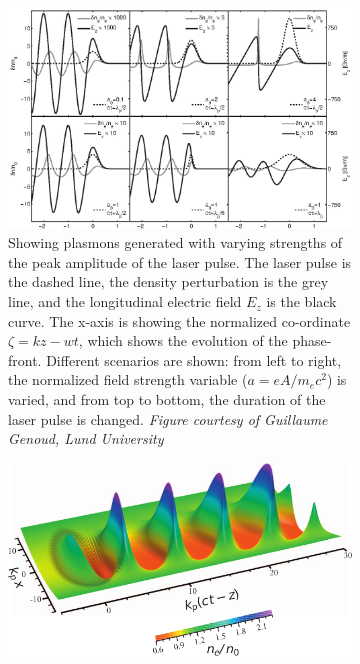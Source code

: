 \documentclass[12pt,letter]{article}
\begin{document}
\begin{figure}[h!]
        \begin{singlespace*}
        \centering
        \label{fig:plasmon}
        \begin{subfigure}[t]{\textwidth}
            \includegraphics[height = .4\textheight]{../figures/densityandewave.eps}
            \caption{\small  Showing plasmons generated with varying strengths of the peak
                amplitude of the laser pulse.\cite{genothesis}\label{fig:plasmon}
                The laser pulse is the dashed line, the density perturbation is the grey
                line, and the longitudinal electric field $E_z$ is the black
                curve. The x-axis is showing the normalized co-ordinate $\zeta =
                kz - wt$, which shows the evolution of the phase-front. Different
                scenarios are shown: from left to right, the normalized field strength variable
                ($a = eA/m_e c^2$) is varied, and from top to bottom, the duration of
                the laser pulse is changed. \em Figure courtesy of Guillaume Genoud, Lund
            University}
            \label{fig:plasmon1}
        \end{subfigure}

        \begin{subfigure}[t]{\textwidth}
            \includegraphics[height = .3\textheight]{../figures/esarey3dnonlin.pdf}


\end{subfigure}
\end{singlespace*}
\end{figure}
\end{document}
